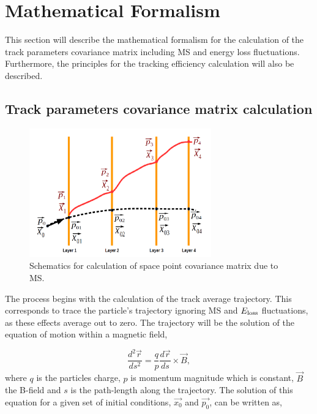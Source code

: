 \section{Mathematical Formalism}
\label{sec:Math_formalism}

This section will describe the mathematical formalism for the calculation of the track parameters covariance matrix including MS and energy loss fluctuations. 
Furthermore, the principles for the tracking efficiency calculation will also be described.

\subsection{Track parameters covariance matrix calculation}
\label{subsec:TrkParm_CovMatrix_calculation}

\begin{figure}
  \centering
  \includegraphics[width=0.7\textwidth]{figures/CalcSquem.pdf}
  \caption{Schematics for calculation of space point covariance matrix due to MS.}
  \label{fig:CalcSquem}
\end{figure}

The process begins with the calculation of the track average trajectory. This corresponds to trace the particle's trajectory 
ignoring MS and $E_{\rm loss}$ fluctuations, as these effects average out to zero. The trajectory will be the solution of the 
equation of motion within a magnetic field,

\begin{equation}
  \frac{d^2 \vec{r}}{ds^2} = \frac{q}{p}\frac{d\vec{r}}{ds}\times \vec{B},
\end{equation}
\noindent
where $q$ is the particles charge, $p$ is momentum magnitude which is constant, $\vec{B}$ the B-field and $s$ is the path-length along 
the trajectory. The solution of this equation for a given set of initial conditions, $\vec{x_0}$ and $\vec{p_0}$, can be written as,

